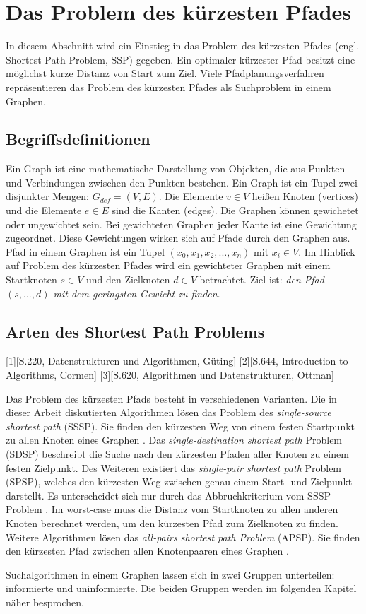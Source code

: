 \chapter{Das Problem des kürzesten Pfades}

In diesem Abschnitt wird ein Einstieg in das Problem des kürzesten Pfades (engl. Shortest Path Problem, SSP) gegeben. Ein optimaler kürzester Pfad besitzt eine möglichst kurze Distanz von Start zum Ziel\cite{Madkour.2017}. Viele Pfadplanungsverfahren repräsentieren das Problem des kürzesten Pfades als Suchproblem in einem Graphen.


\section{Begriffsdefinitionen}

Ein Graph ist eine mathematische Darstellung von Objekten, die aus Punkten und Verbindungen zwischen den Punkten bestehen. Ein Graph ist ein Tupel zwei disjunkter Mengen: $G_{def}= (V,E)$. Die Elemente $v \in V$ heißen Knoten (vertices) und die Elemente $e \in E$ sind die Kanten (edges). Die Graphen können gewichetet oder ungewichtet sein. Bei gewichteten Graphen jeder Kante ist eine Gewichtung zugeordnet. Diese Gewichtungen wirken sich auf Pfade durch den Graphen aus\cite{Gross.2004}. Pfad in einem Graphen ist ein Tupel $\left ( x_{0}, x_{1}, x_{2}, ..., x_{n} \right )$ mit $x_{i} \in V$.  Im Hinblick auf Problem des kürzesten Pfades wird ein gewichteter Graphen mit einem Startknoten $s \in V$ und den Zielknoten $d \in V$ betrachtet. Ziel ist: \textit{den Pfad  $\left ( s, ..., d \right )$ mit dem geringsten Gewicht zu finden}\cite{Madkour.2017}. 

\section{Arten des Shortest Path Problems}


[1][S.220, Datenstrukturen und Algorithmen, Güting]
[2][S.644, Introduction to Algorithms, Cormen]
[3][S.620, Algorithmen und Datenstrukturen, Ottman]


Das Problem des kürzesten Pfads besteht in verschiedenen Varianten. Die in dieser Arbeit diskutierten Algorithmen lösen das Problem des \textit{single-source shortest path} (SSSP). Sie finden den kürzesten Weg von einem festen Startpunkt zu allen Knoten eines Graphen \cite{Gu.2018}. Das \textit{single-destination shortest path} Problem (SDSP)  beschreibt die Suche nach den kürzesten Pfaden aller Knoten zu einem festen Zielpunkt. Des Weiteren existiert das \textit{single-pair shortest path} Problem (SPSP), welches den kürzesten Weg zwischen genau einem Start- und Zielpunkt darstellt. Es unterscheidet sich nur durch das Abbruchkriterium vom SSSP Problem \cite{Ottmann.2017}. Im worst-case muss die Distanz vom Startknoten zu allen anderen Knoten berechnet werden, um den kürzesten Pfad zum Zielknoten zu finden. Weitere Algorithmen lösen das \textit{all-pairs shortest path Problem} (APSP). Sie finden den kürzesten Pfad zwischen allen Knotenpaaren eines Graphen \cite{Cormen.2009}.



Suchalgorithmen in einem Graphen lassen sich in zwei Gruppen unterteilen: informierte und uninformierte. Die beiden Gruppen werden im folgenden Kapitel näher besprochen.
